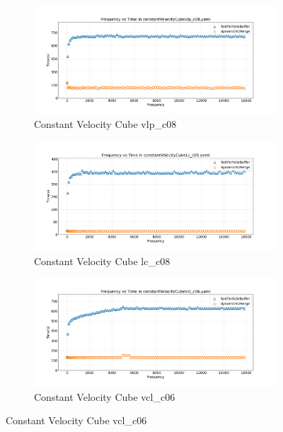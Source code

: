 \begin{figure}[htbp]
    \centering
    \vspace{-0.5em}
    \begin{subfigure}[b]{\textwidth}
        \centering
        \includegraphics[width=0.9\linewidth]{graphs/constantVelocityCube/normalExperiments/freq/vlpc08.png}
        \vspace{-0.5em}
        \caption{\scriptsize Constant Velocity Cube vlp\_c08}
        \label{fig:vlpc08constantVelocityCube}
    \end{subfigure}

    \begin{subfigure}[b]{\textwidth}
        \centering
        \includegraphics[width=0.9\linewidth]{graphs/constantVelocityCube/normalExperiments/freq/lcc08.png}
        \vspace{-0.5em}
        \caption{\scriptsize Constant Velocity Cube lc\_c08}
        \label{fig:lcc08constantVelocityCube}
    \end{subfigure}

    \begin{subfigure}[b]{\textwidth}
        \centering
        \includegraphics[width=0.9\linewidth]{graphs/constantVelocityCube/normalExperiments/freq/vclc06.png}
        \vspace{-0.5em}
        \caption{\scriptsize Constant Velocity Cube vcl\_c06}
        \label{fig:vclc06constantVelocityCube}
    \end{subfigure}


\end{figure}

